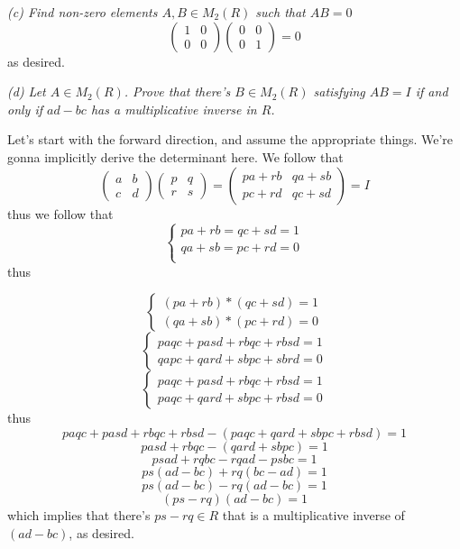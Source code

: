 \documentclass[11pt,oneside,titlepage]{book}
\begin{document}
\textit{(c) Find non-zero elements $A, B \in M_2(R)$ such that $AB = 0$}
$$
\begin{pmatrix}
  1 & 0 \\
  0 & 0
\end{pmatrix}
\begin{pmatrix}
  0 & 0 \\
  0 & 1
\end{pmatrix} = 0
$$
as desired.

\textit{(d) Let $A \in M_2(R)$. Prove that there's $B \in M_2(R)$
satisfying $AB = I$ if and only if $ad - bc$ has a multiplicative
inverse in $R$.}

Let's start with the forward direction, and assume the appropriate
things. We're gonna implicitly derive the determinant here. We follow that
$$
\begin{pmatrix}
  a & b \\
  c & d
\end{pmatrix}
\begin{pmatrix}
  p & q \\
  r & s
\end{pmatrix} =
\begin{pmatrix}
  pa + rb & qa + sb \\
  pc + rd & qc + sd  
\end{pmatrix} = I
$$
thus we follow that
$$
\begin{cases}
  pa + rb = qc + sd = 1 \\
  qa + sb = pc + rd = 0 \\
\end{cases}
$$
thus

$$
\begin{cases}
  (pa + rb) * (qc + sd) = 1  \\
  (qa + sb) * (pc + rd) = 0
\end{cases}
$$
$$
\begin{cases}
  paqc + pasd + rbqc + rbsd = 1 \\
  qapc + qard + sbpc + sbrd = 0
\end{cases}
$$
$$
\begin{cases}
  paqc + pasd + rbqc + rbsd = 1 \\
  paqc + qard + sbpc + rbsd = 0
\end{cases}
$$
thus
$$ paqc + pasd + rbqc + rbsd -   (paqc + qard + sbpc + rbsd) = 1 $$
$$ pasd + rbqc - (qard + sbpc) = 1 $$
$$ psad + rqbc - rqad - psbc = 1 $$
$$ ps(ad - bc) + rq(bc - ad) = 1 $$
$$ ps(ad - bc) - rq(ad - bc) = 1 $$
$$ (ps - rq) (ad - bc) = 1 $$
which implies that there's $ps - rq \in R$ that is a multiplicative
inverse of $(ad - bc)$, as desired.
\end{document}
